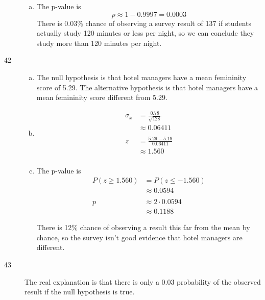 \documentclass[letterpaper, landscape]{exam}
\begin{document}
\begin{description}
\begin{enumerate}[(a)]
          \item The p-value is 
            \[
              p \approx 1 - 0.9997 = \boxed{ 0.0003 } 
            \]
            There is 0.03\% chance of observing a survey result of 137 if
            students actually study 120 minutes or less per night, so we can
            conclude they study more than 120 minutes per night.

        \end{enumerate}

      \item[42]
        \begin{enumerate}[(a)]
          \item The null hypothesis is that hotel managers have a mean
            femininity score of 5.29. The alternative hypothesis is that hotel
            managers have a mean femininity score different from 5.29.

          \item
            \begin{align*}
              \sigma_{\bar{x}} & = \frac{0.78}{\sqrt{128}} \\
                               & \approx 0.06411 \\
              \\
              z & = \frac{5.29 - 5.19}{0.06411} \\
                & \approx \boxed{ 1.560 } \\
            \end{align*}

          \item The p-value is 
            \begin{align*}
              P(z \geq 1.560) & = P(z \leq -1.560) \\
                              & \approx 0.0594 \\
              \\
              p & \approx 2 \cdot 0.0594 \\
                & \approx \boxed{ 0.1188 }
            \end{align*}

            There is 12\% chance of observing a result this far from the mean by
            chance, so the survey isn't good evidence that hotel managers are
            different.

        \end{enumerate}

      \item[43] The real explanation is that there is only a 0.03 probability of
        the observed result if the null hypothesis is true. 
        

\end{description}
\end{document}
